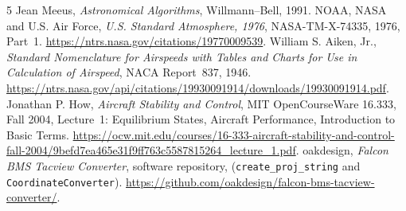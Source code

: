 \documentclass[10pt,a4paper]{amsart}
\begin{document}
\begin{thebibliography}{5}
Jean Meeus, \emph{Astronomical Algorithms}, Willmann--Bell, 1991.
NOAA, NASA and U.S. Air Force, \emph{U.S. Standard Atmosphere, 1976},
NASA-TM-X-74335, 1976, Part~1.
\url{https://ntrs.nasa.gov/citations/19770009539}.
William S. Aiken, Jr., \emph{Standard Nomenclature for Airspeeds with
Tables and Charts for Use in Calculation of Airspeed},
NACA Report~837, 1946.
\url{https://ntrs.nasa.gov/api/citations/19930091914/downloads/19930091914.pdf}.
Jonathan P. How, \emph{Aircraft Stability and Control},
MIT OpenCourseWare 16.333, Fall 2004, Lecture~1:
Equilibrium States, Aircraft Performance, Introduction to Basic Terms.
\url{https://ocw.mit.edu/courses/16-333-aircraft-stability-and-control-fall-2004/9befd7ea465e31f9ff763c5587815264_lecture_1.pdf}.
oakdesign, \emph{Falcon BMS Tacview Converter}, software repository,
(\texttt{create\_proj\_string} and \texttt{CoordinateConverter}).
\url{https://github.com/oakdesign/falcon-bms-tacview-converter/}.
\end{thebibliography}
\end{document}
